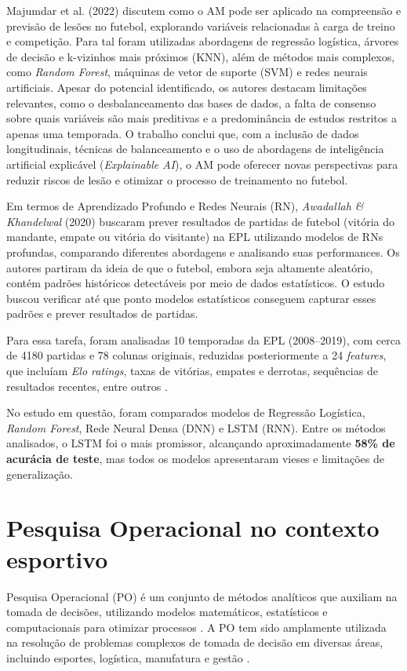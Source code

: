 Majumdar et al. (2022) discutem como o AM pode ser aplicado na compreensão e previsão de lesões no futebol, explorando variáveis relacionadas à carga de treino e competição. Para tal foram utilizadas abordagens de regressão logística, árvores de decisão e k-vizinhos mais próximos (KNN), além de métodos mais complexos, como \textit{Random Forest}, máquinas de vetor de suporte (SVM) e redes neurais artificiais. Apesar do potencial identificado, os autores destacam limitações relevantes, como o desbalanceamento das bases de dados, a falta de consenso sobre quais variáveis são mais preditivas e a predominância de estudos restritos a apenas uma temporada. O trabalho conclui que, com a inclusão de dados longitudinais, técnicas de balanceamento e o uso de abordagens de inteligência artificial explicável (\textit{Explainable AI}), o AM pode oferecer novas perspectivas para reduzir riscos de lesão e otimizar o processo de treinamento no futebol.

Em termos de Aprendizado Profundo e Redes Neurais (RN), \textit{Awadallah \& Khandelwal} (2020) buscaram prever resultados de partidas de futebol (vitória do mandante, empate ou vitória do visitante) na EPL utilizando modelos de RNs profundas, comparando diferentes abordagens e analisando suas performances. Os autores partiram da ideia de que o futebol, embora seja altamente aleatório, contém padrões históricos detectáveis por meio de dados estatísticos. O estudo buscou verificar até que ponto modelos estatísticos conseguem capturar esses padrões e prever resultados de partidas.

Para essa tarefa, foram analisadas 10 temporadas da EPL (2008–2019), com cerca de 4180 partidas e 78 colunas originais, reduzidas posteriormente a 24 \textit{features}, que incluíam \textit{Elo ratings}, taxas de vitórias, empates e derrotas, sequências de resultados recentes, entre outros \cite{awadallah2020}.

No estudo em questão, foram comparados modelos de Regressão Logística, \textit{Random Forest}, Rede Neural Densa (DNN) e LSTM (RNN). Entre os métodos analisados, o LSTM foi o mais promissor, alcançando aproximadamente \textbf{58\% de acurácia de teste}, mas todos os modelos apresentaram vieses e limitações de generalização.


\section{Pesquisa Operacional no contexto esportivo}

Pesquisa Operacional (PO) é um conjunto de métodos analíticos que auxiliam na tomada de decisões, utilizando modelos matemáticos, estatísticos e computacionais para otimizar processos \cite{Medri2009}. A PO tem sido amplamente utilizada na resolução de problemas complexos de tomada de decisão em diversas áreas, incluindo esportes, logística, manufatura e gestão \cite{Wright2009}.

